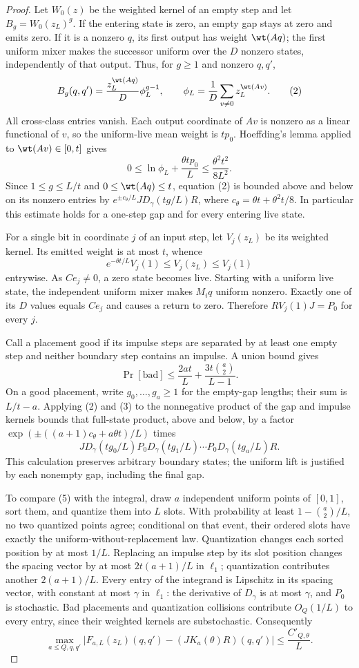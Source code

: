 \begin{proof}
Let $W_0(z)$ be the weighted kernel of an empty step and let
$B_g=W_0(z_L)^g$. If the entering state is zero, an empty gap stays at
zero and emits zero. If it is a nonzero $q$, its first output has weight
$\wt(Aq)$; the first uniform mixer makes the successor uniform over the
$D$ nonzero states, independently of that output. Thus, for $g\ge1$
and nonzero $q,q'$,
\[
 B_g(q,q')=\frac{z_L^{\wt(Aq)}}D\phi_L^{g-1},\qquad
 \phi_L=\frac1D\sum_{v\ne0}z_L^{\wt(Av)}.
 \tag{2}
\]
All cross-class entries vanish. Each output coordinate of $Av$ is
nonzero as a linear functional of $v$, so the uniform-live mean weight
is $t p_0$. Hoeffding's lemma applied to $\wt(Av)\in[0,t]$ gives
\[
 0\le\ln\phi_L+\frac{\theta tp_0}{L}
 \le\frac{\theta^2t^2}{8L^2}.
\]
Since $1\le g\le L/t$ and $0\le\wt(Aq)\le t$, equation (2) is
bounded above and below on its nonzero entries by
$e^{\pm c_\theta/L}JD_\gamma(tg/L)R$, where
$c_\theta=\theta t+\theta^2t/8$. In particular this estimate holds
for a one-step gap and for every entering live state.

For a single bit in coordinate $j$ of an input step, let $V_j(z_L)$
be its weighted kernel. Its emitted weight is at most $t$, whence
\[
 e^{-\theta t/L}V_j(1)\le V_j(z_L)\le V_j(1)
 \tag{3}
\]
entrywise. As $Ce_j\ne0$, a zero state becomes live. Starting with a
uniform live state, the independent uniform mixer makes $M_iq$
uniform nonzero. Exactly one of its $D$ values equals $Ce_j$ and
causes a return to zero. Therefore
$RV_j(1)J=P_0$ for every $j$.

Call a placement good if its impulse steps are separated by at least
one empty step and neither boundary step contains an impulse. A union
bound gives
\[
 \Pr[\mathrm{bad}]
 \le\frac{2at}{L}+\frac{3t\binom a2}{L-1}.
 \tag{4}
\]
On a good placement, write $g_0,\ldots,g_a\ge1$ for the empty-gap
lengths; their sum is $L/t-a$. Applying (2) and (3) to the nonnegative
product of the gap and impulse kernels bounds that full-state product,
above and below, by a factor
$\exp(\pm((a+1)c_\theta+a\theta t)/L)$ times
\[
 J D_\gamma(tg_0/L)P_0D_\gamma(tg_1/L)
   \cdots P_0D_\gamma(tg_a/L)R.
 \tag{5}
\]
This calculation preserves arbitrary boundary states; the uniform
lift is justified by each nonempty gap, including the final gap.

To compare (5) with the integral, draw $a$ independent uniform points
of $[0,1]$, sort them, and quantize them into $L$ slots. With
probability at least $1-\binom a2/L$, no two quantized points agree;
conditional on that event, their ordered slots have exactly the
uniform-without-replacement law. Quantization changes each sorted
position by at most $1/L$. Replacing an impulse step by its slot
position changes the spacing vector by at most
$2t(a+1)/L$ in $\ell_1$; quantization contributes another
$2(a+1)/L$. Every entry of the integrand is Lipschitz in its spacing
vector, with constant at most $\gamma$ in $\ell_1$: the derivative of
$D_\gamma$ is at most $\gamma$, and $P_0$ is stochastic. Bad placements
and quantization collisions contribute $O_Q(1/L)$ to every entry,
since their weighted kernels are substochastic. Consequently
\[
 \max_{a\le Q,q,q'}
 \bigl|F_{a,L}(z_L)(q,q')-(JK_a(\theta)R)(q,q')\bigr|
 \le\frac{C'_{Q,\theta}}L.
 \tag{6}
\]


\end{proof}
